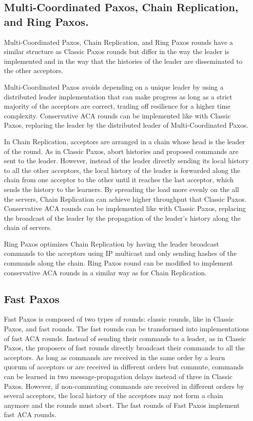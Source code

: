 \subsection{Multi-Coordinated Paxos, Chain Replication, and Ring Paxos.}

Multi-Coordinated Paxos, Chain Replication, and Ring Paxos rounds have a similar
structure as Classic Paxos rounds but differ in the way the leader is
implemented and in the way that the histories of the leader are disseminated to
the other acceptors.

Multi-Coordinated Paxos avoids depending on a unique leader by using a
distributed leader implementation that can make progress as long as a
strict majority of the acceptors are correct, trading off resilience
for a higher time complexity. Conservative ACA
rounds can be implemented like with Classic Paxos, replacing the
leader by the distributed leader of Multi-Coordinated Paxos.

In Chain Replication, acceptors are arranged in a chain whose head is
the leader of the round. As in Classic Paxos, abort histories and
proposed commands are sent to the leader. However, instead of the
leader directly sending its local history to all the other acceptors,
the local history of the leader is
forwarded along the chain from one acceptor to the other until it
reaches the last acceptor, which sends the history to the learners. 
By spreading the load more evenly on the all the servers, Chain Replication
can achieve higher throughput that Classic Paxos.
Conservative ACA rounds can be implemented like with Classic Paxos,
replacing the broadcast of the leader by the propagation of the leader's history
along the chain of servers.

Ring Paxos optimizes Chain Replication by having the leader broadcast
commands to the acceptors using IP multicast and only sending hashes
of the commands along the chain. Ring Paxos round can be modified to implement
conservative ACA rounds in a similar way as for Chain Replication.

\subsection{Fast Paxos}

Fast Paxos is composed of two types of rounds: classic rounds, like in Classic
Paxos, and fast rounds.
The fast rounds can be transformed into
implementations of fast ACA rounds. Instead of sending their
commands to a leader, as in Classic Paxos, the proposers of fast
rounds directly broadcast their commands to all the acceptors. As long
as commands are received in the same order by a learn quorum of
acceptors or are received in different orders but commute, commands can be learned in two message-propagation delays instead of three in Classic Paxos.
However, if non-commuting commands are received in different orders by
several acceptors, the local history of the acceptors may not form a
chain anymore and the rounds must abort. The fast rounds of Fast
Paxos implement fast ACA rounds.

